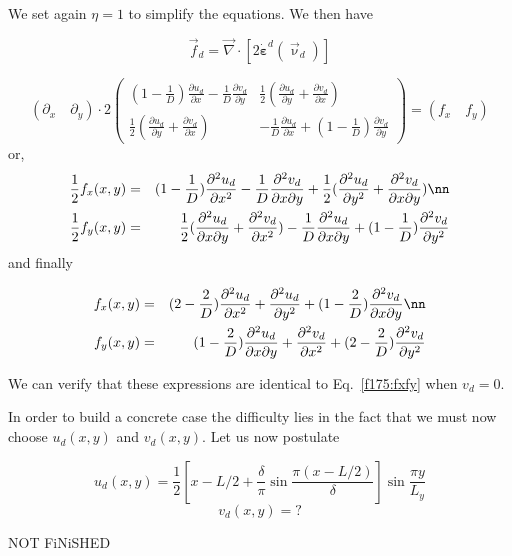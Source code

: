 We set again $\eta=1$ to simplify the equations. We then have 

\[
\vec{f}_d = \vec\nabla \cdot [2  \dot{\bm \varepsilon}^d(\vec\upnu_d)  ]  
\]

\[
(\partial_x \quad \partial_y) \cdot 2  
\begin{pmatrix}
(1-\frac{1}{D}) \frac{\partial u_d}{\partial x}- \frac{1}{D} \frac{\partial v_d}{\partial y}
& \frac12 (\frac{\partial u_d}{\partial y}+ \frac{\partial v_d}{\partial x})  \\
\frac12 (\frac{\partial u_d}{\partial y}+ \frac{\partial v_d}{\partial x})  
& -\frac{1}{D} \frac{\partial u_d}{\partial x} + (1- \frac{1}{D})  \frac{\partial v_d}{\partial y} 
\end{pmatrix} 
=(f_x \quad f_y)
\]
or, 
\begin{eqnarray}
\frac12 f_x(x,y) &=&  (1-\frac{1}{D}) \frac{\partial^2 u_d}{\partial x^2}- \frac{1}{D} \frac{\partial^2 v_d}{\partial x\partial y} 
+ \frac12 (\frac{\partial^2 u_d}{\partial y^2}+ \frac{\partial^2 v_d}{\partial x \partial y}) \nn\\
\frac12 f_y(x,y) &=& \frac12 (\frac{\partial^2 u_d}{\partial x \partial y}+ \frac{\partial^2 v_d}{\partial x^2})
 -\frac{1}{D} \frac{\partial^2 u_d}{\partial x \partial y} + (1- \frac{1}{D})  \frac{\partial^2 v_d}{\partial y^2} 
\end{eqnarray}
and finally

\begin{eqnarray}
f_x(x,y) &=&  (2-\frac{2}{D}) \frac{\partial^2 u_d}{\partial x^2}
+  \frac{\partial^2 u_d}{\partial y^2}
+ (1 - \frac{2}{D}) \frac{\partial^2 v_d}{\partial x\partial y}  \nn\\
f_y(x,y) &=& (1 - \frac{2}{D}) \frac{\partial^2 u_d}{\partial x\partial y} 
+ \frac{\partial^2 v_d}{\partial x^2} + (2-\frac{2}{D}) \frac{\partial^2 v_d}{\partial y^2}
\end{eqnarray}

We can verify that these expressions are identical to Eq.~\eqref{f175:fxfy} when $v_d=0$.

In order to build a concrete case the difficulty lies in the fact that we must now 
choose $u_d(x,y)$ and $v_d(x,y)$.
Let us now postulate 

\[
u_d(x,y) = \frac12 \left[ x-L/2 + \frac{\delta }{\pi  }\sin  \frac{ \pi (x-L/2)}{\delta} \right]
\sin \frac{\pi y}{L_y}
\]
\[
v_d(x,y)=?
\]

{\color{red} NOT FiNiSHED}





